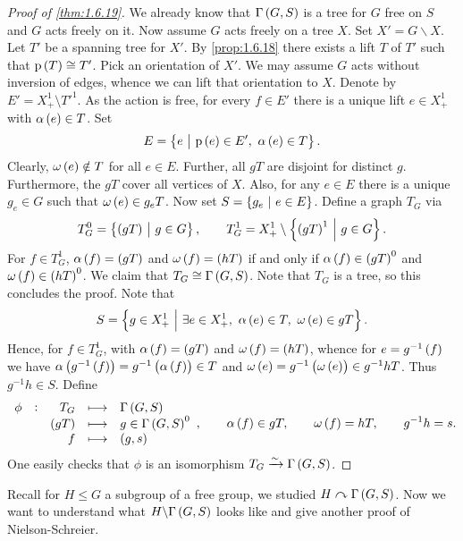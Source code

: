 \begin{proof}[Proof of \ref{thm:1.6.19}]
We already know that $ \Gamma\br{G, S} $ is a tree for $ G $ free on $ S $ and $ G $ acts freely on it. Now assume $ G $ acts freely on a tree $ X $. Set $ X' = G \backslash X $. Let $ T' $ be a spanning tree for $ X' $. By \ref{prop:1.6.18} there exists a lift $ T $ of $ T' $ such that $ \p\br{T} \cong T' $. Pick an orientation of $ X' $. We may assume $ G $ acts without inversion of edges, whence we can lift that orientation to $ X $. Denote by $ E' = X_+^1 \setminus T'^1 $. As the action is free, for every $ f \in E' $ there is a unique lift $ e \in X_+^1 $ with $ \alpha\br{e} \in T $. Set
$$ E = \cbr{e \st \p\br{e} \in E', \ \alpha\br{e} \in T}. $$
Clearly, $ \omega\br{e} \notin T $ for all $ e \in E $. Further, all $ gT $ are disjoint for distinct $ g $. Furthermore, the $ gT $ cover all vertices of $ X $. Also, for any $ e \in E $ there is a unique $ g_e \in G $ such that $ \omega\br{e} \in g_eT $. Now set $ S = \cbr{g_e \st e \in E} $. Define a graph $ T_G $ via
$$ T_G^0 = \cbr{\br{gT} \st g \in G}, \qquad T_G^1 = X_+^1 \setminus \cbr{\br{gT}^1 \st g \in G}. $$
For $ f \in T_G^1 $, $ \alpha\br{f} = \br{gT} $ and $ \omega\br{f} = \br{hT} $ if and only if $ \alpha\br{f} \in \br{gT}^0 $ and $ \omega\br{f} \in \br{hT}^0 $. We claim that $ T_G \cong \Gamma\br{G, S} $. Note that $ T_G $ is a tree, so this concludes the proof. Note that
$$ S = \cbr{g \in X_+^1 \st \exists e \in X_+^1, \ \alpha\br{e} \in T, \ \omega\br{e} \in gT}. $$
Hence, for $ f \in T_G^1 $, with $ \alpha\br{f} = \br{gT} $ and $ \omega\br{f} = \br{hT} $, whence for $ e = g^{-1}\br{f} $ we have $ \alpha\br{g^{-1}\br{f}} = g^{-1}\br{\alpha\br{f}} \in T $ and $ \omega\br{e} = g^{-1}\br{\omega\br{e}} \in g^{-1}hT $. Thus $ g^{-1}h \in S $. Define
$$
\begin{array}{ccrcl}
\phi & : & T_G & \longmapsto & \Gamma\br{G, S} \\
& & \br{gT} & \longmapsto & g \in \Gamma\br{G, S}^0 \\
& & f & \longmapsto & \br{g, s}
\end{array},
\qquad \alpha\br{f} \in gT, \qquad \omega\br{f} = hT, \qquad g^{-1}h = s. $$
One easily checks that $ \phi $ is an isomorphism $ T_G \xrightarrow{\sim} \Gamma\br{G, S} $.
\end{proof}

Recall for $ H \le G $ a subgroup of a free group, we studied $ H \curvearrowright \Gamma\br{G, S} $. Now we want to understand what $ H \backslash \Gamma\br{G, S} $ looks like and give another proof of Nielson-Schreier.

